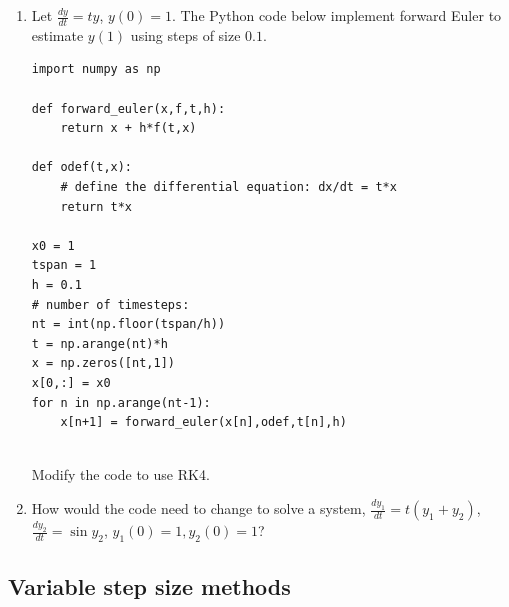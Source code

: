 \documentclass[12pt,letterpaper,noanswers]{exam}
\begin{document}
    
    
    
    

\begin{enumerate}[resume]
\item Let $\frac{dy}{dt} = ty$, $y(0) = 1$.  The Python code below implement forward Euler to estimate $y(1)$ using steps of size $0.1$.

\begin{lstlisting}
import numpy as np

def forward_euler(x,f,t,h):
    return x + h*f(t,x)

def odef(t,x):
    # define the differential equation: dx/dt = t*x
    return t*x

x0 = 1
tspan = 1
h = 0.1
# number of timesteps:
nt = int(np.floor(tspan/h))
t = np.arange(nt)*h
x = np.zeros([nt,1])
x[0,:] = x0
for n in np.arange(nt-1):
    x[n+1] = forward_euler(x[n],odef,t[n],h)
    
\end{lstlisting}

Modify the code to use RK4.


\vspace{1in}

\item How would the code need to change to solve a system, $\frac{dy_1}{dt} = t(y_1+y_2)$, $\frac{dy_2}{dt} = \sin y_2$, $y_1(0) = 1, y_2(0) = 1$?
\end{enumerate}

\subsection*{Variable step size methods}


\end{document}
